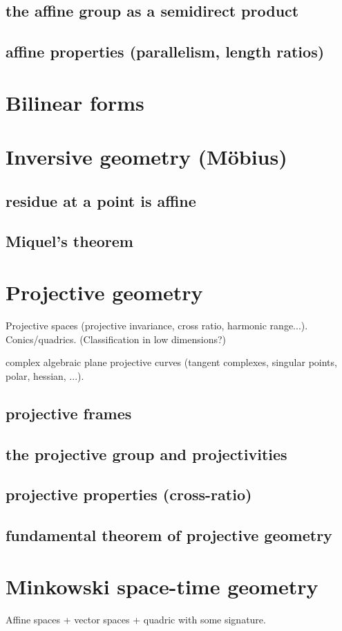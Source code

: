 \section{the affine group as a semidirect product}
\section{affine properties (parallelism, length ratios)}
\chapter{Bilinear forms}
\chapter{Inversive geometry (Möbius)}
\section{residue at a point is affine}
\section{Miquel's theorem}
\chapter{Projective geometry}
Projective spaces (projective invariance, cross ratio, harmonic range...). Conics/quadrics. (Classification in low dimensions?)
\par
complex algebraic plane projective curves (tangent complexes, singular points, polar, hessian, ...).
\section{projective frames}
\section{the projective group and projectivities}
\section{projective properties (cross-ratio)}
\section{fundamental theorem of projective geometry}
\chapter{Minkowski space-time geometry}
Affine spaces + vector spaces + quadric with some signature.
